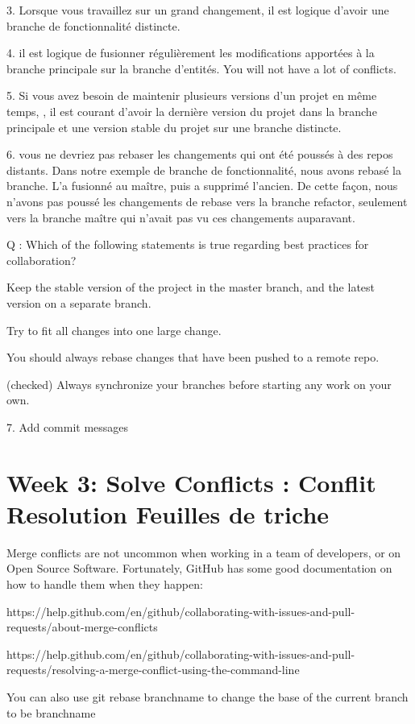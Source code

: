 \documentclass[11pt, onecolumn]{article}
\begin{document}
3. Lorsque vous travaillez sur un grand changement, il est logique d'avoir une branche de fonctionnalité distincte. 

4. il est logique de fusionner régulièrement les modifications apportées à la branche principale sur la branche d'entités.  You will not have a lot of conflicts.

5. Si vous avez besoin de maintenir plusieurs versions d'un projet en même temps, , il est courant d'avoir la dernière version du projet dans la branche principale et une version stable du projet sur une branche distincte. 

6. vous ne devriez pas rebaser les changements qui ont été poussés à des repos distants. Dans notre exemple de branche de fonctionnalité, nous avons rebasé la branche. L'a fusionné au maître, puis a supprimé l'ancien. De cette façon, nous n'avons pas poussé les changements de rebase vers la branche refactor, seulement vers la branche maître qui n'avait pas vu ces changements auparavant. 


Q : Which of the following statements is true regarding best practices for collaboration?

Keep the stable version of the project in the master branch, and the latest version on a separate branch.

Try to fit all changes into one large change.

You should always rebase changes that have been pushed to a remote repo.

(checked) Always synchronize your branches before starting any work on your own.


7. Add commit messages

\section{Week 3: Solve Conflicts : Conflit Resolution Feuilles de triche}

Merge conflicts are not uncommon when working in a team of developers, or on Open Source Software. Fortunately, GitHub has some good documentation on how to handle them when they happen:

    https://help.github.com/en/github/collaborating-with-issues-and-pull-requests/about-merge-conflicts

    https://help.github.com/en/github/collaborating-with-issues-and-pull-requests/resolving-a-merge-conflict-using-the-command-line

You can also use git rebase branchname to change the base of the current branch to be branchname
\end{document}
